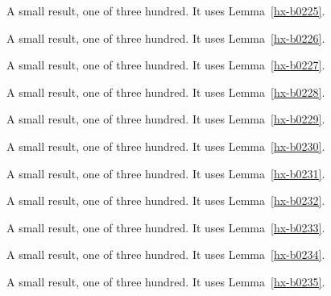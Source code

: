 \begin{lemma}[Bulk 226]\label{hx-b0226}
A small result, one of three hundred. It uses Lemma~\ref{hx-b0225}.
\end{lemma}

\begin{lemma}[Bulk 227]\label{hx-b0227}
A small result, one of three hundred. It uses Lemma~\ref{hx-b0226}.
\end{lemma}

\begin{lemma}[Bulk 228]\label{hx-b0228}
A small result, one of three hundred. It uses Lemma~\ref{hx-b0227}.
\end{lemma}

\begin{lemma}[Bulk 229]\label{hx-b0229}
A small result, one of three hundred. It uses Lemma~\ref{hx-b0228}.
\end{lemma}

\begin{lemma}[Bulk 230]\label{hx-b0230}
A small result, one of three hundred. It uses Lemma~\ref{hx-b0229}.
\end{lemma}

\begin{lemma}[Bulk 231]\label{hx-b0231}
A small result, one of three hundred. It uses Lemma~\ref{hx-b0230}.
\end{lemma}

\begin{lemma}[Bulk 232]\label{hx-b0232}
A small result, one of three hundred. It uses Lemma~\ref{hx-b0231}.
\end{lemma}

\begin{lemma}[Bulk 233]\label{hx-b0233}
A small result, one of three hundred. It uses Lemma~\ref{hx-b0232}.
\end{lemma}

\begin{lemma}[Bulk 234]\label{hx-b0234}
A small result, one of three hundred. It uses Lemma~\ref{hx-b0233}.
\end{lemma}

\begin{lemma}[Bulk 235]\label{hx-b0235}
A small result, one of three hundred. It uses Lemma~\ref{hx-b0234}.
\end{lemma}

\begin{lemma}[Bulk 236]\label{hx-b0236}
A small result, one of three hundred. It uses Lemma~\ref{hx-b0235}.
\end{lemma}

